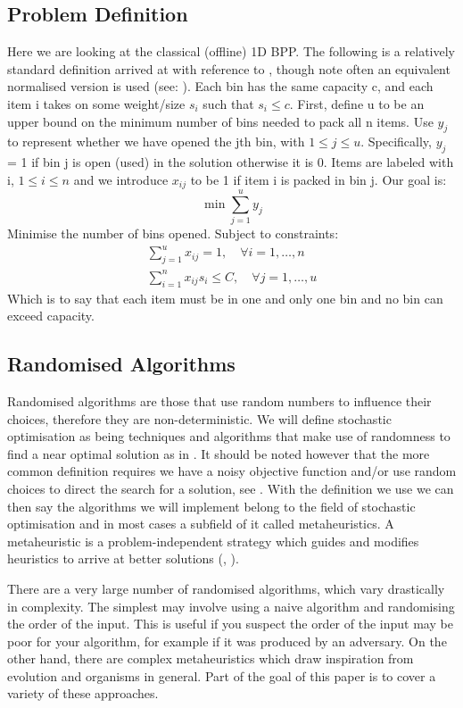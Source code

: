 \documentclass[12pt]{article}
\begin{document}
\subsection{Problem Definition}
Here we are looking at the classical (offline) 1D BPP. The following is a relatively standard definition arrived at with reference to \cite{munien}, though note often an equivalent normalised version is used (see: \cite{maxence}). Each bin has the same capacity c, and each item i takes on some weight/size $s_{i}$ such that $s_{i} \leq c$. First, define u to be an upper bound on the minimum number of bins needed to pack all n items. Use $y_{j}$ to represent whether we have opened the jth bin, with $1 \leq j \leq u$. Specifically, $y_j$ = 1 if bin j is open (used) in the solution otherwise it is 0. Items are labeled with i, $1 \leq i \leq n$ and we introduce $x_{ij}$ to be 1 if item i is packed in bin j. Our goal is:
\[
\min\sum_{j=1}^{u} y_j 
\]
Minimise the number of bins opened. Subject to constraints:
\[
\begin{aligned}
\sum_{j=1}^{u} x_{ij} = 1, \quad \forall i = 1, \dots, n \\
\sum_{i=1}^{n} x_{ij} s_{i}  \leq C  , \quad \forall j = 1, \dots, u
\end{aligned}
\]
Which is to say that each item must be in one and only one bin and no bin can exceed capacity.

\subsection{Randomised Algorithms}
Randomised algorithms are those that use random numbers to influence their choices, therefore they are non-deterministic. We will define stochastic optimisation as being techniques and algorithms that make use of randomness to find a near optimal solution as in \cite{sean}. It should be noted however that the more common definition requires we have a noisy objective function and/or use random choices to direct the search for a solution, see . With the definition we use we can then say the algorithms we will implement belong to the field of stochastic optimisation and in most cases a subfield of it called metaheuristics. A metaheuristic is a problem-independent strategy which guides and modifies heuristics to arrive at better solutions (\cite{glover}, \cite{yang}). 

There are a very large number of randomised algorithms, which vary drastically in complexity. The simplest may involve using a naive algorithm and randomising the order of the input. This is useful if you suspect the order of the input may be poor for your algorithm, for example if it was produced by an adversary. On the other hand, there are complex metaheuristics which draw inspiration from evolution and organisms in general. Part of the goal of this paper is to cover a variety of these approaches. 
\end{document}

